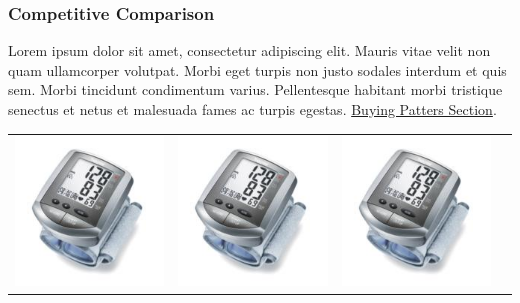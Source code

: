 \documentclass[11pt,titlepage]{article}
\begin{document}
\subsubsection{Competitive Comparison}
Lorem ipsum dolor sit amet, consectetur adipiscing elit. Mauris vitae velit 
non quam ullamcorper volutpat. Morbi eget turpis non justo sodales interdum 
et quis sem. Morbi tincidunt condimentum varius. Pellentesque habitant morbi 
tristique senectus et netus et malesuada fames ac turpis egestas.\newline
\hyperlink{competition_and_buying_patterns}{Buying Patters Section}.\newline\newline

\begin{tabular}{| m{92 pt} | m{92 pt} | m{92 pt} | m{92 pt} |}\hline
  \includegraphics[scale=0.40,bb=0 0 150 150]{prod_bpm1.jpg} & 
  \includegraphics[scale=0.40,bb=0 0 150 150]{prod_bpm2.jpg} & 
  \includegraphics[scale=0.40,bb=0 0 150 150]{prod_bpm3.jpg} & 

\end{tabular}
\end{document}
